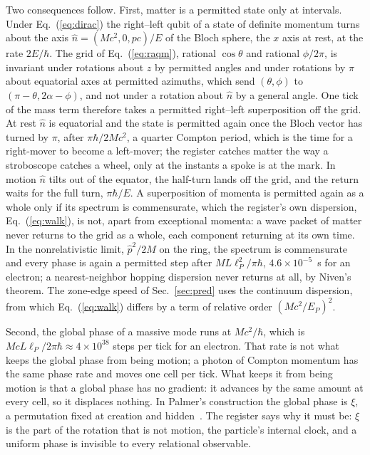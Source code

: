 \documentclass[aps,prd,twocolumn,superscriptaddress,nofootinbib]{revtex4-2}
\begin{document}
Two consequences follow. First, matter is a permitted state only at intervals. Under Eq.~(\ref{eq:dirac}) the right--left qubit of a state of definite momentum turns about the axis $\hat n = (Mc^2, 0, pc)/E$ of the Bloch sphere, the $x$ axis at rest, at the rate $2E/\hbar$. The grid of Eq.~(\ref{eq:raqm}), rational $\cos\theta$ and rational $\phi/2\pi$, is invariant under rotations about $z$ by permitted angles and under rotations by $\pi$ about equatorial axes at permitted azimuths, which send $(\theta,\phi)$ to $(\pi-\theta, 2\alpha-\phi)$, and not under a rotation about $\hat n$ by a general angle. One tick of the mass term therefore takes a permitted right--left superposition off the grid. At rest $\hat n$ is equatorial and the state is permitted again once the Bloch vector has turned by $\pi$, after $\pi\hbar/2Mc^2$, a quarter Compton period, which is the time for a right-mover to become a left-mover; the register catches matter the way a stroboscope catches a wheel, only at the instants a spoke is at the mark. In motion $\hat n$ tilts out of the equator, the half-turn lands off the grid, and the return waits for the full turn, $\pi\hbar/E$. A superposition of momenta is permitted again as a whole only if its spectrum is commensurate, which the register's own dispersion, Eq.~(\ref{eq:walk}), is not, apart from exceptional momenta: a wave packet of matter never returns to the grid as a whole, each component returning at its own time. In the nonrelativistic limit, $\hat p^2/2M$ on the ring, the spectrum is commensurate and every phase is again a permitted step after $ML\ell_P^2/\pi\hbar$, $4.6\times10^{-5}$~s for an electron; a nearest-neighbor hopping dispersion never returns at all, by Niven's theorem. The zone-edge speed of Sec.~\ref{sec:pred} uses the continuum dispersion, from which Eq.~(\ref{eq:walk}) differs by a term of relative order $(Mc^2/E_P)^2$.

Second, the global phase of a massive mode runs at $Mc^2/\hbar$, which is $McL\ell_P/2\pi\hbar\approx4\times10^{38}$ steps per tick for an electron. That rate is not what keeps the global phase from being motion; a photon of Compton momentum has the same phase rate and moves one cell per tick. What keeps it from being motion is that a global phase has no gradient: it advances by the same amount at every cell, so it displaces nothing. In Palmer's construction the global phase is $\xi$, a permutation fixed at creation and hidden~\cite{palmer2026c}. The register says why it must be: $\xi$ is the part of the rotation that is not motion, the particle's internal clock, and a uniform phase is invisible to every relational observable.
\end{document}
